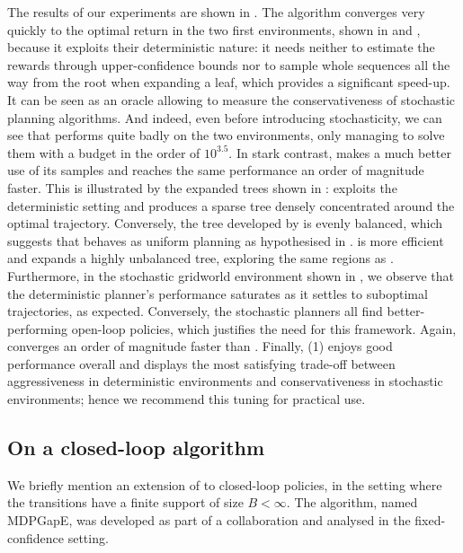 The results of our experiments are shown in . The \OPD algorithm converges very quickly to the optimal return in the two first environments, shown in  and , because it exploits their deterministic nature: it needs neither to estimate the rewards through upper-confidence bounds nor to sample whole sequences all the way from the root when expanding a leaf, which provides a significant speed-up. It can be seen as an oracle allowing to measure the conservativeness of stochastic planning algorithms. And indeed, even before introducing stochasticity, we can see that \OLOP performs quite badly on the two environments, only managing to solve them with a budget in the order of $10^{3.5}$. In stark contrast, \KLOLOP makes a much better use of its samples and reaches the same performance an order of magnitude faster. This is illustrated by the expanded trees shown in : \OPD exploits the deterministic setting and produces a sparse tree densely concentrated around the optimal trajectory. Conversely, the tree developed by \OLOP is evenly balanced, which suggests that \OLOP behaves as uniform planning as hypothesised in . \KLOLOP is more efficient and expands a highly unbalanced tree, exploring the same regions as \OPD. Furthermore, in the stochastic gridworld environment shown in , we observe that the deterministic \OPD planner's performance saturates as it settles to suboptimal trajectories, as expected. Conversely, the stochastic planners all find better-performing open-loop policies, which justifies the need for this framework. Again, \KLOLOP converges an order of magnitude faster than \OLOP. Finally, \KLOLOP(1) enjoys good performance overall and displays the most satisfying trade-off between aggressiveness in deterministic environments and conservativeness in stochastic environments; hence we recommend this tuning for practical use.

\subsection{On a closed-loop algorithm}

We briefly mention an extension of \KLOLOP to closed-loop policies, in the setting where the transitions have a finite support of size $B < \infty$. The algorithm, named \gls{MDPGapE}, was developed as part of a collaboration \citep{Jonsson2020planning} and analysed in the fixed-confidence setting.

